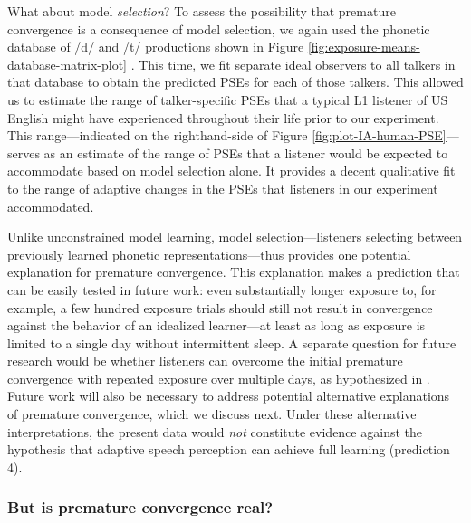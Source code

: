 \documentclass[
  11pt,
  man,mask,floatsintext]{apa6}
\begin{document}
What about model \emph{selection}? To assess the possibility that premature convergence is a consequence of model selection, we again used the phonetic database of /d/ and /t/ productions shown in Figure \ref{fig:exposure-means-database-matrix-plot} \autocite{chodroff-wilson2018}. This time, we fit separate ideal observers to all talkers in that database to obtain the predicted PSEs for each of those talkers. This allowed us to estimate the range of talker-specific PSEs that a typical L1 listener of US English might have experienced throughout their life prior to our experiment. This range---indicated on the righthand-side of Figure \ref{fig:plot-IA-human-PSE}---serves as an estimate of the range of PSEs that a listener would be expected to accommodate based on model selection alone. It provides a decent qualitative fit to the range of adaptive changes in the PSEs that listeners in our experiment accommodated.

Unlike unconstrained model learning, model selection---listeners selecting between previously learned phonetic representations---thus provides one potential explanation for premature convergence. This explanation makes a prediction that can be easily tested in future work: even substantially longer exposure to, for example, a few hundred exposure trials should still not result in convergence against the behavior of an idealized learner---at least as long as exposure is limited to a single day without intermittent sleep. A separate question for future research would be whether listeners can overcome the initial premature convergence with repeated exposure over multiple days, as hypothesized in \textcite{xie2018}. Future work will also be necessary to address potential alternative explanations of premature convergence, which we discuss next. Under these alternative interpretations, the present data would \emph{not} constitute evidence against the hypothesis that adaptive speech perception can achieve full learning (prediction 4).

\subsubsection{But is premature convergence real?}\label{but-is-premature-convergence-real}
\end{document}
